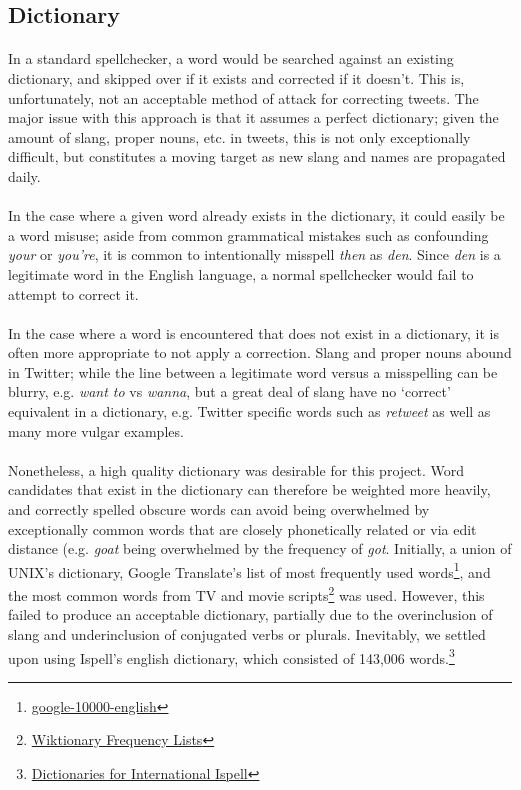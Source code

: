 \documentclass[twocolumn,10pt]{article}
\begin{document}
\subsection*{Dictionary}
\paragraph{} In a standard spellchecker, a word would be searched against an existing dictionary, and skipped over if it exists and corrected if it doesn't. This is, unfortunately, not an acceptable method of attack for correcting tweets. The major issue with this approach is that it assumes a perfect dictionary; given the amount of slang, proper nouns, etc. in tweets, this is not only exceptionally difficult, but constitutes a moving target as new slang and names are propagated daily.
\paragraph{} In the case where a given word already exists in the dictionary, it could easily be a word misuse; aside from common grammatical mistakes such as confounding \textit{your} or \textit{you're}, it is common to intentionally misspell \textit{then} as \textit{den}. Since \textit{den} is a legitimate word in the English language, a normal spellchecker would fail to attempt to correct it. 
\paragraph{} In the case where a word is encountered that does not exist in a dictionary, it is often more appropriate to not apply a correction. Slang and proper nouns abound in Twitter; while the line between a legitimate word versus a misspelling can be blurry, e.g. \textit{want to} vs \textit{wanna}, but a great deal of slang have no `correct' equivalent in a dictionary, e.g. Twitter specific words such as \textit{retweet} as well as many more vulgar examples.
\paragraph{}Nonetheless, a high quality dictionary was desirable for this project. Word candidates that exist in the dictionary can therefore be weighted more heavily, and correctly spelled obscure words can avoid being overwhelmed by exceptionally common words that are closely phonetically related or via edit distance (e.g. \textit{goat} being overwhelmed by the frequency of \textit{got}. Initially, a union of UNIX's dictionary, Google Translate's list of most frequently used words\footnote{\href{https://github.com/first20hours/google-10000-english}{google-10000-english}}, and the most common words from TV and movie scripts\footnote{\href{http://en.wiktionary.org/wiki/Wiktionary:Frequency_lists\#TV_and_movie_scripts}{Wiktionary Frequency Lists}} was used. However, this failed to produce an acceptable dictionary, partially due to the overinclusion of slang and underinclusion of conjugated verbs or plurals. Inevitably, we settled upon using Ispell's english dictionary, which consisted of 143,006 words.\footnote{\href{http://fmg-www.cs.ucla.edu/geoff/ispell-dictionaries.html}{Dictionaries for International Ispell}}
\end{document}
